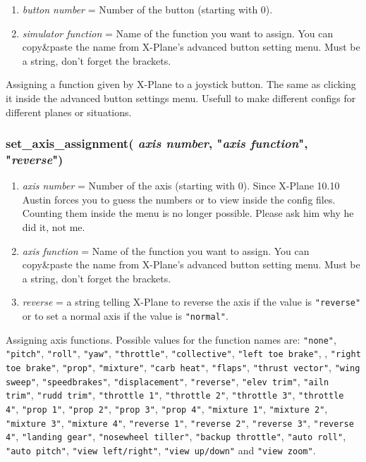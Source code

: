 \documentclass[11pt,parskip=half,a4paper]{scrartcl}
\begin{document}
\begin{enumerate}
	\item \emph{button number} = Number of the button (starting with 0).
	\item \emph{simulator function} = Name of the function you want to assign. You can copy\&paste the name from X-Plane's advanced button setting menu. Must be a string, don't forget the brackets.
\end{enumerate}

Assigning a function given by X-Plane to a joystick button. The same as clicking it inside the advanced button settings menu. Usefull to make different configs for different planes or situations.

\newpage
\subsubsection{set\_axis\_assignment( \emph{axis number}, "\emph{axis function}", "\emph{reverse}")}

\begin{enumerate}
	\item \emph{axis number} = Number of the axis (starting with 0). Since X-Plane 10.10 Austin forces you to guess the numbers or to view inside the config files. Counting them inside the menu is no longer possible. Please ask him why he did it, not me.
	\item \emph{axis function} = Name of the function you want to assign. You can copy\&paste the name from X-Plane's advanced button setting menu. Must be a string, don't forget the brackets.
	\item \emph{reverse} = a string telling X-Plane to reverse the axis if the value is \verb|"reverse"| or to set a normal axis if the value is \verb|"normal"|.
\end{enumerate}

Assigning axis functions. Possible values for the function names are: \verb|"none"|, \verb|"pitch"|, \verb|"roll"|, \verb|"yaw"|, \verb|"throttle"|, \verb|"collective"|, \verb|"left toe brake"|, , \verb|"right toe brake"|, \verb|"prop"|, \verb|"mixture"|, \verb|"carb heat"|, \verb|"flaps"|, \verb|"thrust vector"|, \verb|"wing sweep"|, \verb|"speedbrakes"|, \verb|"displacement"|, \verb|"reverse"|, \verb|"elev trim"|, \verb|"ailn trim"|, \verb|"rudd trim"|, \verb|"throttle 1"|, \verb|"throttle 2"|, \verb|"throttle 3"|, \verb|"throttle 4"|, \verb|"prop 1"|, \verb|"prop 2"|, \verb|"prop 3"|, \verb|"prop 4"|, \verb|"mixture 1"|, \verb|"mixture 2"|, \verb|"mixture 3"|, \verb|"mixture 4"|, \verb|"reverse 1"|, \verb|"reverse 2"|, \verb|"reverse 3"|, \verb|"reverse 4"|, \verb|"landing gear"|, \verb|"nosewheel tiller"|, \verb|"backup throttle"|, \verb|"auto roll"|, \verb|"auto pitch"|, \verb|"view left/right"|, \verb|"view up/down"| and \verb|"view zoom"|.
	
\end{document}
